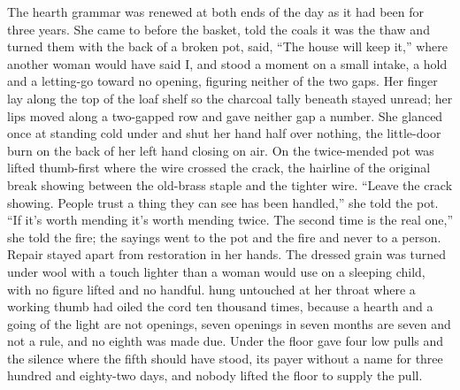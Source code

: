 The hearth grammar was renewed at both ends of the day as it had been for three years. She came to  before the basket, told the coals it was the thaw and turned them with the back of a broken pot, said, “The house will keep it,” where another woman would have said I, and stood a moment on a small intake, a hold and a letting-go toward no opening, figuring neither of the two gaps. Her finger lay along the top of the loaf shelf so the charcoal tally beneath stayed unread; her lips moved along a two-gapped row and gave neither gap a number. She glanced once at  standing cold under  and shut her hand half over nothing, the little-door burn on the back of her left hand closing on air. On  the twice-mended pot was lifted thumb-first where the wire crossed the crack, the hairline of the original break showing between the old-brass staple and the tighter wire. “Leave the crack showing. People trust a thing they can see has been handled,” she told the pot. “If it's worth mending it's worth mending twice. The second time is the real one,” she told the fire; the sayings went to the pot and the fire and never to a person. Repair stayed apart from restoration in her hands. The dressed grain was turned under wool with a touch lighter than a woman would use on a sleeping child, with no figure lifted and no handful.  hung untouched at her throat where a working thumb had oiled the cord ten thousand times, because a hearth and a going of the light are not openings, seven openings in seven months are seven and not a rule, and no eighth was made due. Under the floor  gave four low pulls and the silence where the fifth should have stood, its payer without a name for three hundred and eighty-two days, and nobody lifted the floor to supply the pull.

\scenebreak


